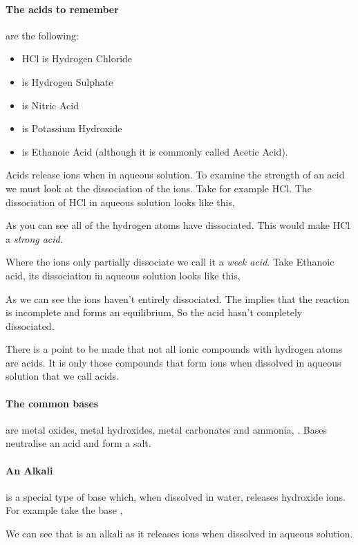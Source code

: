 	\paragraph{The acids to remember} are the following:
	\begin{itemize}
		\item HCl is Hydrogen Chloride
		\item {} is Hydrogen Sulphate
		\item {} is Nitric Acid
		\item {} is Potassium Hydroxide
		\item {} is Ethanoic Acid (although it is commonly called Acetic Acid).
	\end{itemize}
	
	Acids release  ions when in aqueous solution.
	To examine the strength of an acid we must look at the dissociation of the  ions.
	Take for example HCl. The dissociation of HCl in aqueous solution looks like this, 
	\begin{center}
	\end{center}
	As you can see all of the hydrogen atoms have dissociated.
	This would make HCl a \textit{strong acid}. 
	
	Where the  ions only partially dissociate we call it a \textit{week acid}. Take Ethanoic acid, its dissociation in aqueous solution looks like this, 
	\begin{center}
	\end{center}
	 As we can see the  ions haven't entirely dissociated.
	 The \ch{<=>} implies that the reaction is incomplete and forms an equilibrium, So the acid hasn't completely dissociated.
	
	There is a point to be made that not all ionic compounds with hydrogen atoms are acids.
	It is only those compounds that form  ions when dissolved in aqueous solution that we call acids.
	
	\paragraph{The common bases} are metal oxides, metal hydroxides, metal carbonates and ammonia, .
	Bases neutralise an acid and form a salt.
	
	\paragraph{An Alkali} is a special type of base which, when dissolved in water, releases hydroxide ions.
	For example take the base ,
	\begin{center}
	\end{center}
	We can see that  is an alkali as it releases  ions when dissolved in aqueous solution.
	
